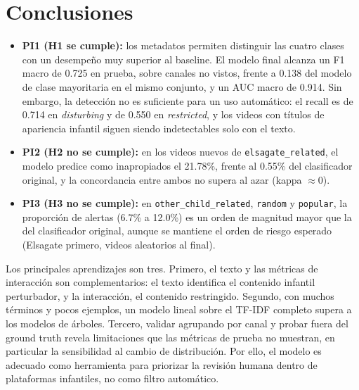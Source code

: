 \documentclass[conference]{IEEEtran}
\begin{document}
\section{Conclusiones}\label{sec:conclusiones}
\begin{itemize}
\item \textbf{PI1 (H1 se cumple):} los metadatos permiten distinguir las cuatro clases con un desempeño muy superior al baseline. El modelo final alcanza un F1 macro de 0.725 en prueba, sobre canales no vistos, frente a 0.138 del modelo de clase mayoritaria en el mismo conjunto, y un AUC macro de 0.914. Sin embargo, la detección no es suficiente para un uso automático: el recall es de 0.714 en \textit{disturbing} y de 0.550 en \textit{restricted}, y los videos con títulos de apariencia infantil siguen siendo indetectables solo con el texto.
\item \textbf{PI2 (H2 no se cumple):} en los videos nuevos de \texttt{elsagate\_related}, el modelo predice como inapropiados el 21.78\%, frente al 0.55\% del clasificador original, y la concordancia entre ambos no supera al azar (kappa $\approx 0$).
\item \textbf{PI3 (H3 no se cumple):} en \texttt{other\_child\_related}, \texttt{random} y \texttt{popular}, la proporción de alertas (6.7\% a 12.0\%) es un orden de magnitud mayor que la del clasificador original, aunque se mantiene el orden de riesgo esperado (Elsagate primero, videos aleatorios al final).
\end{itemize}
Los principales aprendizajes son tres. Primero, el texto y las métricas de interacción son complementarios: el texto identifica el contenido infantil perturbador, y la interacción, el contenido restringido. Segundo, con muchos términos y pocos ejemplos, un modelo lineal sobre el TF-IDF completo supera a los modelos de árboles. Tercero, validar agrupando por canal y probar fuera del ground truth revela limitaciones que las métricas de prueba no muestran, en particular la sensibilidad al cambio de distribución. Por ello, el modelo es adecuado como herramienta para priorizar la revisión humana dentro de plataformas infantiles, no como filtro automático.

\end{document}
